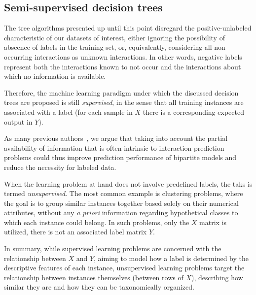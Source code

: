 \subsection{Semi-supervised decision trees}

The tree algorithms presented up until this point disregard the positive-unlabeled characteristic of our datasets of interest, either ignoring the possibility of abscence of labels in the training set, or, equivalently, considering all non-occurring interactions as unknown interactions.
In other words, negative labels represent both the interactions known to not occur and the interactions about which no information is available.

Therefore, the machine learning paradigm under which the discussed decision trees are proposed is still \emph{supervised}, in the sense that all training instances are associated with a label (for each sample in $X$ there is a corresponding expected output in $Y$).

As many previous authors~\cite{liu2017lpinrlmf,he2017simboost},%
we argue that taking into account the partial availability of information that is often intrinsic to interaction prediction problems could thus improve prediction performance of bipartite models and reduce the necessity for labeled data.

When the learning problem at hand does not involve predefined labels, the taks is termed \emph{unsupervised}. The most common example is clustering problems, where the goal is to group similar instances together based solely on their numerical attributes, without any \textit{a priori} information regarding hypothetical classes to which each instance could belong. In such problems, only the $X$ matrix is utilized, there is not an associated label matrix $Y$.

In summary, while supervised learning problems are concerned with the relationship between $X$ and $Y$, aiming to model how a label is determined by the descriptive features of each instance, unsupervised learning problems target the relationship between instances themselves (between rows of $X$), describing how similar they are and how they can be taxonomically organized.

